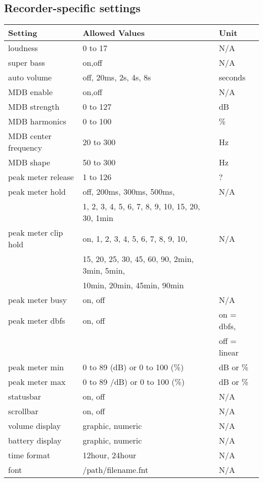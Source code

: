\subsection{Recorder{}-specific settings}
\begin{center}
  \begin{tabular}{@{}lll@{}}\toprule
    \textbf{Setting} & \textbf{Allowed Values} & \textbf{Unit}\\\midrule
     loudness & 0 to 17 & N/A\\
     super bass & on,off & N/A\\
     auto volume & off, 20ms, 2s, 4s, 8s & seconds\\
     MDB enable & on,off & N/A\\
     MDB strength & 0 to 127 & dB\\
     MDB harmonics & 0 to 100 & \%\\
     MDB center frequency & 20 to 300 & Hz\\
     MDB shape & 50 to 300 & Hz\\
     peak meter release & 1 to 126 & ?\\
     peak meter hold & off, 200ms, 300ms, 500ms, & N/A \\
                     & 1, 2, 3, 4, 5, 6, 7, 8, 9, 10, 15, 20, 30, 1min & \\
     peak meter clip hold & on, 1, 2, 3, 4, 5, 6, 7, 8, 9, 10,& N/A \\
                     & 15, 20, 25, 30, 45, 60, 90, 2min, 3min, 5min, &\\
                     & 10min, 20min, 45min, 90min & \\
     peak meter busy & on, off & N/A\\
     peak meter dbfs & on, off & on = dbfs,\\
                     &         & off = linear\\
     peak meter min  & 0 to 89 (dB) or 0 to 100 (\%) & dB or \%\\
     peak meter max  & 0 to 89 /dB) or 0 to 100 (\%) & dB or \%\\
     statusbar & on, off & N/A\\
     scrollbar & on, off & N/A\\
     volume display & graphic, numeric & N/A\\
     battery display & graphic, numeric & N/A\\
     time format & 12hour, 24hour & N/A\\
     font & /path/filename.fnt & N/A\\

\end{tabular}
\end{center}
